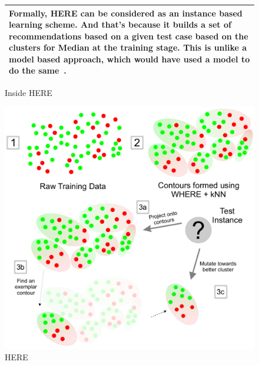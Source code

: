 \documentclass[conference]{IEEEtran}
\begin{document}
\begin{figure}[htbp!]
\begin{tabular}{|p{.95\linewidth}|}
Formally, HERE can be considered as an instance based  learning scheme. And that's because it builds a set of recommendations based on a given test case based on the clusters for Median at the training stage. This is unlike a model based approach, which would have used a model to do the same~\cite{xomo}.
\\\hline
\end{tabular}
\caption{Inside HERE}\label{fig:what}
\end{figure}

\begin{figure}
\centering
\includegraphics[width=\linewidth]{_figs/WHAT-Clusters2.pdf}
\caption{HERE}
\label{fig:whatflow}
\end{figure}
\end{document}
